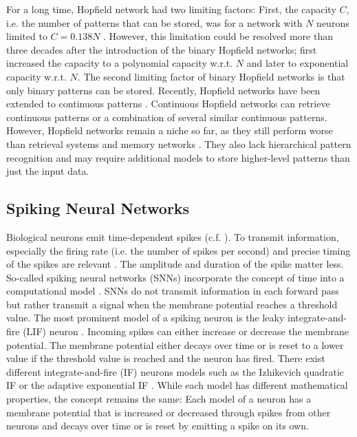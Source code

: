 For a long time, Hopfield network had two limiting factors: First, the capacity $C$, i.e. the number of patterns that can be stored, was for a network with $N$ neurons limited to $C=0.138N$ .
However, this limitation could be resolved more than three decades after the introduction of the binary Hopfield networks; 
 first increased the capacity to a polynomial capacity w.r.t. $N$ and  later to exponential capacity w.r.t. $N$.
The second limiting factor of binary Hopfield networks is that only binary patterns can be stored.
Recently, Hopfield networks have been extended to continuous patterns .
Continuous Hopfield networks can retrieve continuous patterns or a combination of several similar continuous patterns.
However, Hopfield networks remain a niche so far, as they still perform worse than retrieval systems \cite{noauthor_information_1997} and memory networks \cite{weston_memory_2015}.
They also lack hierarchical pattern recognition and may require additional models to store higher-level patterns than just the input data.


\subsection{Spiking Neural Networks}
Biological neurons emit time-dependent spikes (c.f. ).
To transmit information, especially the firing rate (i.e. the number of spikes per second) and precise timing of the spikes are relevant .
The amplitude and duration of the spike matter less.
So-called spiking neural networks (SNNs) incorporate the concept of time into a computational model .
SNNs do not transmit information in each forward pass but rather transmit a signal when the membrane potential reaches a threshold value. 
The most prominent model of a spiking neuron is the leaky integrate-and-fire (LIF) neuron .
Incoming spikes can either increase or decrease the membrane potential.
The membrane potential either decays over time or is reset to a lower value if the threshold value is reached and the neuron has fired.
There exist different integrate-and-fire (IF) neurons models such as the Izhikevich quadratic IF  or the adaptive exponential IF .
While each model has different mathematical properties, the concept remains the same: Each model of a neuron has a membrane potential that is increased or decreased through spikes from other neurons and decays over time or is reset by emitting a spike on its own.

